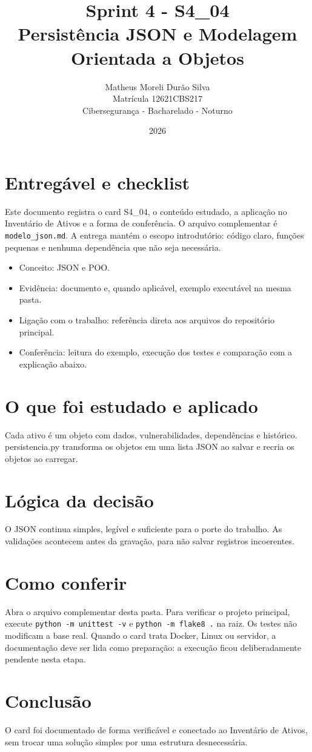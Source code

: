 \documentclass[12pt]{article}
\title{Sprint 4 - S4\_04\\Persistência JSON e Modelagem Orientada a Objetos}
\author{Matheus Moreli Durão Silva\\ Matrícula 12621CBS217\\ Cibersegurança - Bacharelado - Noturno}
\date{2026}
\begin{document}
\maketitle

\section*{Entregável e checklist}
Este documento registra o card S4\_04, o conteúdo estudado, a aplicação no Inventário de Ativos e a forma de conferência. O arquivo complementar é \texttt{modelo\_json.md}. A entrega mantém o escopo introdutório: código claro, funções pequenas e nenhuma dependência que não seja necessária.

\begin{itemize}
\item Conceito: JSON e POO.
\item Evidência: documento e, quando aplicável, exemplo executável na mesma pasta.
\item Ligação com o trabalho: referência direta aos arquivos do repositório principal.
\item Conferência: leitura do exemplo, execução dos testes e comparação com a explicação abaixo.
\end{itemize}

\section*{O que foi estudado e aplicado}
Cada ativo é um objeto com dados, vulnerabilidades, dependências e histórico. persistencia.py transforma os objetos em uma lista JSON ao salvar e recria os objetos ao carregar.

\section*{Lógica da decisão}
O JSON continua simples, legível e suficiente para o porte do trabalho. As validações acontecem antes da gravação, para não salvar registros incoerentes.

\section*{Como conferir}
Abra o arquivo complementar desta pasta. Para verificar o projeto principal, execute \texttt{python -m unittest -v} e \texttt{python -m flake8 .} na raiz. Os testes não modificam a base real. Quando o card trata Docker, Linux ou servidor, a documentação deve ser lida como preparação: a execução ficou deliberadamente pendente nesta etapa.

\section*{Conclusão}
O card foi documentado de forma verificável e conectado ao Inventário de Ativos, sem trocar uma solução simples por uma estrutura desnecessária.
\end{document}
